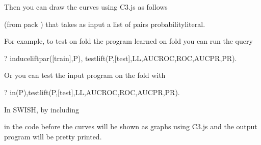 \documentclass[letterpaper,10pt,english]{sphinxmanual}
\begin{document}
\sphinxAtStartPar
Then you can draw the curves using C3.js as follows

\begin{sphinxVerbatim}[commandchars=\\\{\}]
  
\end{sphinxVerbatim}

\sphinxAtStartPar
(from pack ) that takes as input a list  of pairs probability\sphinxhyphen{}literal.

\sphinxAtStartPar
For example, to test on fold  the program learned on fold  you can run the query

\begin{sphinxVerbatim}[commandchars=\\\{\}]
?\PYGZhy{} induce\PYGZus{}lift\PYGZus{}par([train],P),
test\PYGZus{}lift(P,[test],LL,AUCROC,ROC,AUCPR,PR).
\end{sphinxVerbatim}

\sphinxAtStartPar
Or you can test the input program on the fold  with

\begin{sphinxVerbatim}[commandchars=\\\{\}]
?\PYGZhy{} in(P),test\PYGZus{}lift(P,[test],LL,AUCROC,ROC,AUCPR,PR).
\end{sphinxVerbatim}

\sphinxAtStartPar
In SWISH, by including

\begin{sphinxVerbatim}[commandchars=\\\{\}]
 
 
\end{sphinxVerbatim}

\sphinxAtStartPar
in the code before  the curves will be shown as graphs using C3.js and the output program will be pretty printed.
\end{document}

